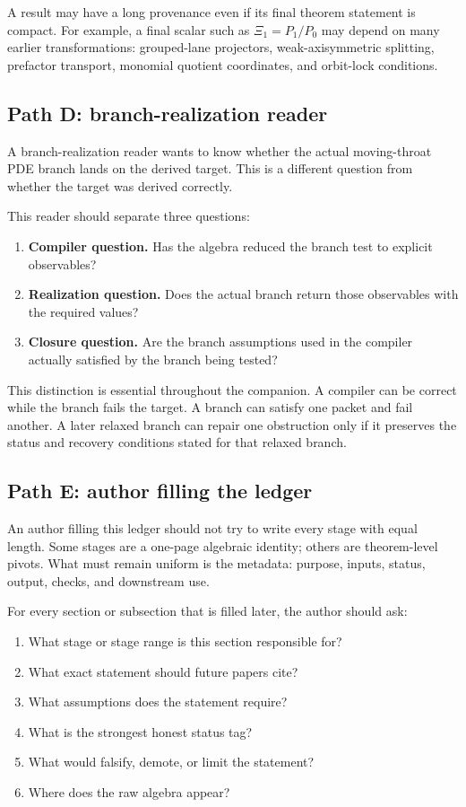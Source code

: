 A result may have a long provenance even if its final theorem statement is compact.  For example, a final scalar such as \(\Xi_1=P_1/P_0\) may depend on many earlier transformations: grouped-lane projectors, weak-axisymmetric splitting, prefactor transport, monomial quotient coordinates, and orbit-lock conditions.

\subsection{Path D: branch-realization reader}
\label{subsec:path-branch-realization-reader}

A branch-realization reader wants to know whether the actual moving-throat PDE branch lands on the derived target.  This is a different question from whether the target was derived correctly.

This reader should separate three questions:
\begin{enumerate}[leftmargin=2.2em]
  \item \textbf{Compiler question.}  Has the algebra reduced the branch test to explicit observables?
  \item \textbf{Realization question.}  Does the actual branch return those observables with the required values?
  \item \textbf{Closure question.}  Are the branch assumptions used in the compiler actually satisfied by the branch being tested?
\end{enumerate}

This distinction is essential throughout the companion.  A compiler can be correct while the branch fails the target.  A branch can satisfy one packet and fail another.  A later relaxed branch can repair one obstruction only if it preserves the status and recovery conditions stated for that relaxed branch.

\subsection{Path E: author filling the ledger}
\label{subsec:path-author-filling-ledger}

An author filling this ledger should not try to write every stage with equal length.  Some stages are a one-page algebraic identity; others are theorem-level pivots.  What must remain uniform is the metadata: purpose, inputs, status, output, checks, and downstream use.

For every section or subsection that is filled later, the author should ask:
\begin{enumerate}[leftmargin=2.2em]
  \item What stage or stage range is this section responsible for?
  \item What exact statement should future papers cite?
  \item What assumptions does the statement require?
  \item What is the strongest honest status tag?
  \item What would falsify, demote, or limit the statement?
  \item Where does the raw algebra appear?
\end{enumerate}

